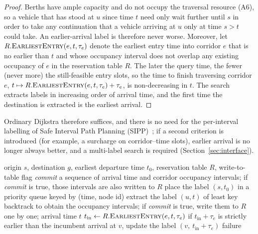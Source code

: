 \documentclass[manuscript,screen,review]{acmart}
\begin{document}
\begin{proof}
  Berths have ample capacity and do not occupy the traversal resource (A6), so a vehicle that has stood at $u$ since time $t$ need only wait further until $s$
  in order to take any continuation that a vehicle arriving at $u$ only at time $s>t$ could take.
  An earlier-arrival label is therefore never worse.
  Moreover, let $R.\textsc{EarliestEntry}(e,t,\tau_e)$ denote the earliest entry time into corridor $e$ that is no earlier than $t$ and whose occupancy interval does not overlap any existing occupancy of $e$ in the reservation table $R$.
  The later the query time, the fewer (never more) the still-feasible entry slots,
  so the time to finish traversing corridor $e$,
  $t\mapsto R.\textsc{EarliestEntry}(e,t,\tau_e)+\tau_e$,
  is non-decreasing in $t$.
  The search extracts labels in increasing order of arrival time, and the first time the destination is extracted is the earliest arrival.
\end{proof}

Ordinary Dijkstra therefore suffices, and there is no need for the per-interval labelling of Safe Interval Path Planning (SIPP)~\cite{kasaura2022sipp}; if a second criterion is introduced (for example, a surcharge on corridor--time slots), earlier arrival is no longer always better, and a multi-label search is required (Section~\ref{sec:interface}).

\begin{algorithm}[t]
  \caption{\textsc{Route}: conflict-free planning of a single leg}
  \label{alg:route}
  \small
  \begin{algorithmic}[1]
  \Require origin $s$, destination $g$, earliest departure time $t_0$, reservation table $R$, write-to-table flag \textit{commit}
  \Ensure a sequence of arrival time and corridor occupancy intervals; if \textit{commit} is true, those intervals are also written to $R$
  \State place the label $(s,t_0)$ in a priority queue keyed by (time, node id)
    \State extract the label $(u,t)$ of least key
     \State backtrack to obtain the occupancy intervals; if \textit{commit} is true, write them to $R$ one by one;
         \Return arrival time $t$ \EndIf
      \State $t_{\text{in}} \gets R.\textsc{EarliestEntry}(e,t,\tau_e)$
      \State if $t_{\text{in}}+\tau_e$ is strictly earlier than the incumbent arrival at $v$, update the label $(v,\ t_{\text{in}}+\tau_e)$
    \EndFor
  \EndWhile
  \State \Return failure 
  \end{algorithmic}
\end{algorithm}
\end{document}
